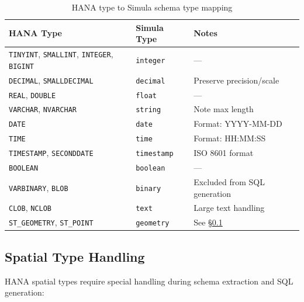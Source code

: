 \begin{table}[H]
\centering
\caption{HANA type to Simula schema type mapping}
\label{tab:hana-type-mapping}
\footnotesize
\begin{tabularx}{\textwidth}{@{}l l X@{}}
\toprule
\textbf{HANA Type} & \textbf{Simula Type} & \textbf{Notes} \\
\midrule
\texttt{TINYINT}, \texttt{SMALLINT}, \texttt{INTEGER}, \texttt{BIGINT} & \texttt{integer} & --- \\
\texttt{DECIMAL}, \texttt{SMALLDECIMAL} & \texttt{decimal} & Preserve precision/scale \\
\texttt{REAL}, \texttt{DOUBLE} & \texttt{float} & --- \\
\texttt{VARCHAR}, \texttt{NVARCHAR} & \texttt{string} & Note max length \\
\texttt{DATE} & \texttt{date} & Format: YYYY-MM-DD \\
\texttt{TIME} & \texttt{time} & Format: HH:MM:SS \\
\texttt{TIMESTAMP}, \texttt{SECONDDATE} & \texttt{timestamp} & ISO 8601 format \\
\texttt{BOOLEAN} & \texttt{boolean} & --- \\
\texttt{VARBINARY}, \texttt{BLOB} & \texttt{binary} & Excluded from SQL generation \\
\texttt{CLOB}, \texttt{NCLOB} & \texttt{text} & Large text handling \\
\texttt{ST\_GEOMETRY}, \texttt{ST\_POINT} & \texttt{geometry} & See \S\ref{sec:spatial-types} \\
\bottomrule
\end{tabularx}
\end{table}

\subsection{Spatial Type Handling}
\label{sec:spatial-types}

HANA spatial types require special handling during schema extraction and SQL
generation:

